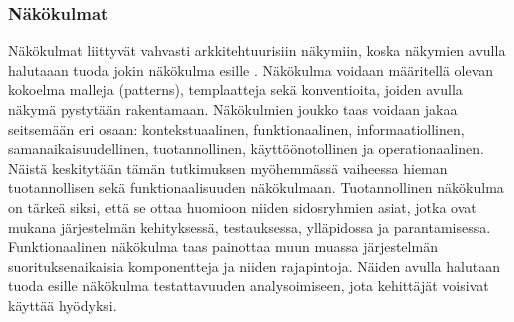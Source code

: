 \documentclass[finnish]{tktltiki2}
\numberwithin{table}{section}
\theoremstyle{definition}
\theoremstyle{remark}
\begin{document}



\subsubsection{Näkökulmat}
Näkökulmat liittyvät vahvasti arkkitehtuurisiin näkymiin, koska näkymien avulla halutaaan tuoda jokin näkökulma esille \citep[s. 36-42]{Rozanski:2011:SSA:2072649}. Näkökulma voidaan määritellä olevan kokoelma malleja (patterns), templaatteja sekä konventioita, joiden avulla näkymä pystytään rakentamaan.  Näkökulmien joukko taas voidaan jakaa seitsemään eri osaan: kontekstuaalinen, funktionaalinen, informaatiollinen, samanaikaisuudellinen, tuotannollinen, käyttöönotollinen ja operationaalinen. Näistä keskitytään tämän tutkimuksen myöhemmässä vaiheessa hieman tuotannollisen sekä funktionaalisuuden näkökulmaan. Tuotannollinen näkökulma on tärkeä siksi, että se ottaa huomioon niiden sidosryhmien asiat, jotka ovat mukana järjestelmän kehityksessä, testauksessa, ylläpidossa ja parantamisessa. Funktionaalinen näkökulma taas painottaa muun muassa järjestelmän suorituksenaikaisia komponentteja ja niiden rajapintoja. Näiden avulla halutaan tuoda esille näkökulma testattavuuden analysoimiseen, jota kehittäjät voisivat käyttää hyödyksi.
\end{document}
